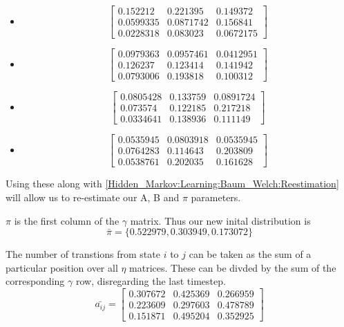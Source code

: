 \begin{example}
        \begin{itemize}
            \item \[
                \begin{bmatrix}
                    0.152212  & 0.221395  & 0.149372  \\
                    0.0599335 & 0.0871742 &  0.156841 \\ 
                    0.0228318 & 0.083023  & 0.0672175 
                \end{bmatrix}
            \]
            \item \[
                \begin{bmatrix}
                    0.0979363 & 0.0957461 &  0.0412951 \\
                    0.126237  & 0.123414  & 0.141942 \\
                    0.0793006 & 0.193818  & 0.100312 
                \end{bmatrix}
            \]           
            \item \[
                \begin{bmatrix}
                    0.0805428 &  0.133759 &  0.0891724 \\
                    0.073574  & 0.122185  & 0.217218 \\
                    0.0334641 &  0.138936 &  0.111149                      
                \end{bmatrix}
            \]
            \item \[
                \begin{bmatrix}
                    0.0535945 & 0.0803918 &  0.0535945 \\
                    0.0764283 & 0.114643  & 0.203809 \\
                    0.0538761 & 0.202035  & 0.161628 
                \end{bmatrix}
            \]
        \end{itemize}

        Using these along with \ref{Hidden_Markov:Learning:Baum_Welch:Reestimation} will allow us to re-estimate our A, B and $\pi$ parameters.

        $\pi$ is the first column of the $\gamma$ matrix. Thus our new inital distribution is 
        \begin{equation}
            \bar{\pi} = \{0.522979, 0.303949,   0.173072\}
        \end{equation}
        
        The number of transtions from state $i$ to $j$ can be taken as the sum of a particular position over all $\eta$ matrices. These can be divded by the sum of the corresponding $\gamma$ row, disregarding the last timestep.
        \begin{equation}
            \bar{a_{ij}} = \begin{bmatrix}
                0.307672  & 0.425369  & 0.266959 \\
                0.223609  & 0.297603  & 0.478789 \\
                0.151871  & 0.495204  & 0.352925
            \end{bmatrix}
        \end{equation}


\end{example}
